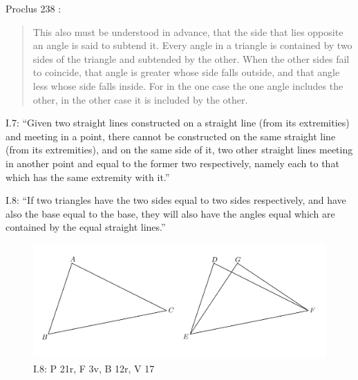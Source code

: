 \documentclass{article}
\begin{document}
Proclus 238 \cite[p.~186]{proclus}:

\begin{quote}
This also must  be understood in advance, that the side that
lies opposite an angle is said to subtend it. Every angle in a 
triangle is contained by two sides of the triangle and subtended by the other.
When the other 
sides fail to coincide, that angle is greater whose side falls
outside, and that angle less whose side falls inside. For in the
one case the one angle includes the other, in the other case it
is included by the other.
\end{quote}

I.7: ``Given two straight lines constructed on a straight line
(from its extremities) and meeting in a point, there cannot be
constructed on the same straight line (from its extremities),
and on the same side of it, two other straight lines meeting in
another point and equal to the former two respectively, namely
each to that which has the same extremity with it.''


I.8: ``If two triangles have the two sides equal to two sides
respectively, and have also the base equal to the base, they will
also have the angles equal which are contained by the equal
straight lines.''

\begin{figure}
\begin{center}
\includegraphics[width=\textwidth]{I8.png}
\end{center}
\caption{I.8: P 21r, F 3v, B 12r, V 17}
\label{I8}
\end{figure}
\end{document}
